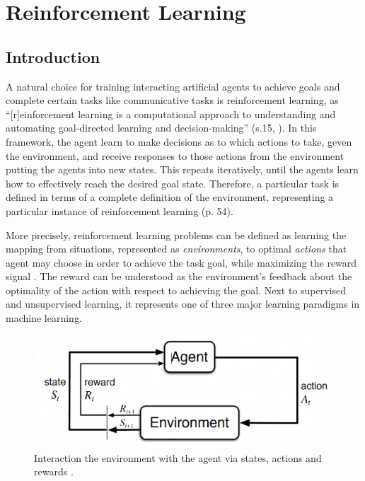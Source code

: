 \section{Reinforcement Learning}


\subsection{Introduction}
A natural choice for training interacting artificial agents to achieve goals and complete certain tasks like communicative tasks is reinforcement learning, as ``[r]einforcement learning is a computational approach to understanding and automating goal-directed learning and decision-making'' (s.15, \cite{sutton2018reinforcement}). In this framework, the agent learn to make decisions as to which actions to take, geven the environment, and receive responses to those actions from the environment putting the agents into new states. This repeats iteratively, until the agents learn how to effectively reach the desired goal state.
Therefore, a particular task is defined in terms of a complete definition of the environment, representing a particular instance of reinforcement learning (p. 54).

More precisely, reinforcement learning problems can be defined as learning the mapping from situations, represented as \textit{environments}, to optimal \textit{actions} that agent may choose in order to achieve the task goal, while maximizing the reward signal \parencite{sutton2018reinforcement}. The reward can be understood as the environment's feedback about the optimality of the action with respect to achieving the goal. Next to supervised and unsupervised learning, it represents one of three major learning paradigms in machine learning. 

\begin{figure}
	\centering
	\includegraphics[width=0.8\linewidth]{images/rl_intro.png}
	\caption{Interaction the environment with the agent via states, actions and rewards \parencite{sutton2018reinforcement}.}
	\label{fig:rl}
\end{figure}

